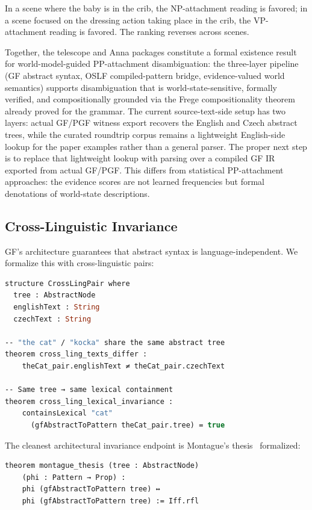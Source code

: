 \documentclass[11pt]{article}
\newcommand{\GF}{\textup{GF}}
\begin{document}
In a scene where the baby is in the crib, the NP-attachment reading is
favored; in a scene focused on the dressing action taking place in the crib,
the VP-attachment reading is favored.  The ranking reverses across scenes.

Together, the telescope and Anna packages constitute a formal existence result
for world-model-guided PP-attachment disambiguation: the three-layer pipeline
(GF abstract syntax, OSLF compiled-pattern bridge, evidence-valued world
semantics) supports disambiguation that is world-state-sensitive, formally
verified, and compositionally grounded via the Frege compositionality theorem
already proved for the grammar.  The current source-text-side setup has two layers:
actual \GF{}/PGF witness export recovers the English and Czech abstract trees,
while the curated roundtrip corpus remains a lightweight English-side lookup for
the paper examples rather than a general parser.  The proper next step is to
replace that lightweight lookup with parsing over a compiled GF IR exported from
actual GF/PGF.  This differs from statistical PP-attachment approaches: the
evidence scores are not learned frequencies but formal denotations of
world-state descriptions.

\subsection{Cross-Linguistic Invariance}

\GF{}'s architecture guarantees that abstract syntax is language-independent.
We formalize this with cross-linguistic pairs:

\begin{lstlisting}[language=ml,caption={Cross-linguistic invariance}]
structure CrossLingPair where
  tree : AbstractNode
  englishText : String
  czechText : String

-- "the cat" / "kocka" share the same abstract tree
theorem cross_ling_texts_differ :
    theCat_pair.englishText ≠ theCat_pair.czechText

-- Same tree → same lexical containment
theorem cross_ling_lexical_invariance :
    containsLexical "cat"
      (gfAbstractToPattern theCat_pair.tree) = true
\end{lstlisting}

The cleanest architectural invariance endpoint is Montague's
thesis~\cite{Montague1973} formalized:

\begin{lstlisting}[language=ml]
theorem montague_thesis (tree : AbstractNode)
    (phi : Pattern → Prop) :
    phi (gfAbstractToPattern tree) ↔
    phi (gfAbstractToPattern tree) := Iff.rfl
\end{lstlisting}
\end{document}
